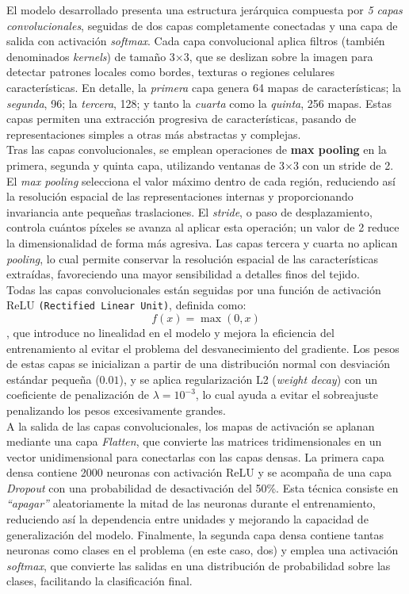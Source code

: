 \documentclass[12pt]{article} %
\begin{document}
El modelo desarrollado presenta una estructura jerárquica compuesta por \textit{5 capas convolucionales}, seguidas de dos capas completamente conectadas y una capa de salida con activación \textit{softmax}. Cada capa convolucional aplica filtros (también denominados \textit{kernels}) de tamaño 3×3, que se deslizan sobre la imagen para detectar patrones locales como bordes, texturas o regiones celulares características. En detalle, la \textit{primera} capa genera 64 mapas de características; la \textit{segunda}, 96; la \textit{tercera}, 128; y tanto la \textit{cuarta} como la \textit{quinta}, 256 mapas. Estas capas permiten una extracción progresiva de características, pasando de representaciones simples a otras más abstractas y complejas.\\

Tras las capas convolucionales, se emplean operaciones de \textbf{max pooling} en la primera, segunda y quinta capa, utilizando ventanas de 3×3 con un stride de 2. El \textit{max pooling} selecciona el valor máximo dentro de cada región, reduciendo así la resolución espacial de las representaciones internas y proporcionando invariancia ante pequeñas traslaciones. El \textit{stride}, o paso de desplazamiento, controla cuántos píxeles se avanza al aplicar esta operación; un valor de 2 reduce la dimensionalidad de forma más agresiva. Las capas tercera y cuarta no aplican \textit{pooling}, lo cual permite conservar la resolución espacial de las características extraídas, favoreciendo una mayor sensibilidad a detalles finos del tejido. \\

Todas las capas convolucionales están seguidas por una función de activación ReLU \texttt{(Rectified Linear Unit)}, definida como: \begin{equation} f(x) = \max(0, x) \end{equation}, que introduce no linealidad en el modelo y mejora la eficiencia del entrenamiento al evitar el problema del desvanecimiento del gradiente. Los pesos de estas capas se inicializan a partir de una distribución normal con desviación estándar pequeña ($0.01$), y se aplica regularización L2 (\textit{weight decay}) con un coeficiente de penalización de $\lambda = 10^{-3}$, lo cual ayuda a evitar el sobreajuste penalizando los pesos excesivamente grandes.\\

A la salida de las capas convolucionales, los mapas de activación se aplanan mediante una capa \textit{Flatten}, que convierte las matrices tridimensionales en un vector unidimensional para conectarlas con las capas densas. La primera capa densa contiene 2000 neuronas con activación ReLU y se acompaña de una capa \textit{Dropout} con una probabilidad de desactivación del 50\%. Esta técnica consiste en \textit{“apagar”} aleatoriamente la mitad de las neuronas durante el entrenamiento, reduciendo así la dependencia entre unidades y mejorando la capacidad de generalización del modelo. Finalmente, la segunda capa densa contiene tantas neuronas como clases en el problema (en este caso, dos) y emplea una activación \textit{softmax}, que convierte las salidas en una distribución de probabilidad sobre las clases, facilitando la clasificación final.\\
\end{document}
